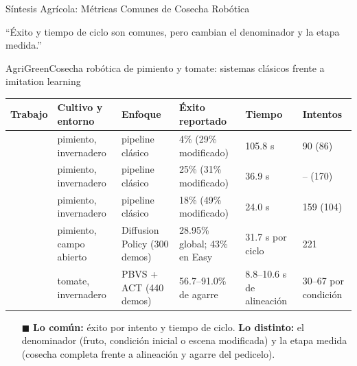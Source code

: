 \documentclass[aspectratio=169,10pt,xcolor={dvipsnames,table}]{beamer}
\newcommand{\BannerFont}{\fontsize{7.5}{9.2}\selectfont\bfseries}       %
\newcommand{\BannerArc}{1.5pt}             %
\newcommand{\BannerRule}{0.5pt}            %
\newcommand{\BannerLeftRule}{2.5pt}        %
\newcommand{\BannerCentral}[2][UCNCyan]{%
  \begin{tcolorbox}[
    enhanced,
    colback=#1!10,
    colframe=#1,
    boxrule=\BannerRule,
    leftrule=\BannerLeftRule,
    arc=\BannerArc,
    top=0.35mm, bottom=0.35mm, left=2mm, right=2mm
  ]
    {\BannerFont\raggedright\textcolor{UCNBlue}{#2}\par}
  \end{tcolorbox}%
  \vspace{-2.5mm}%
}
\newcommand{\BannerRef}[1]{{\mdseries\fontsize{5}{6}\selectfont\textcolor{TextDark!65}{\cite{#1}}}} %
\newcommand{\TabFont}{\fontsize{5.3}{6.4}\selectfont}                    %
\begin{document}
\begin{frame}{Síntesis Agrícola: Métricas Comunes de Cosecha Robótica}
  \BannerCentral[AgriGreen]{``Éxito y tiempo de ciclo son comunes, pero cambian el denominador y la etapa medida.'' \BannerRef{kim2025pepper,rong2026tomato}}
  \vspace{0.8mm}
  \begin{Card}{AgriGreen}{Cosecha robótica de pimiento y tomate: sistemas clásicos frente a imitation learning}
    {\TabFont
    \setlength{\tabcolsep}{1.4pt}
    \renewcommand{\arraystretch}{1.15}
    \begin{tabular}{@{}L{22mm} L{25mm} L{24mm} L{30mm} L{20mm} L{18mm}@{}}
      \toprule
      \textbf{Trabajo} & \textbf{Cultivo y entorno} & \textbf{Enfoque} & \textbf{Éxito reportado} & \textbf{Tiempo} & \textbf{Intentos} \\
      \midrule
      \cite{bac2017pepper} & pimiento, invernadero & pipeline clásico & 4\% (29\% modificado) & 105.8 s & 90 (86) \\
      \cite{lehnert2020pepper} & pimiento, invernadero & pipeline clásico & 25\% (31\% modificado) & 36.9 s & -- (170) \\
      \cite{arad2020pepper} & pimiento, invernadero & pipeline clásico & 18\% (49\% modificado) & 24.0 s & 159 (104) \\
       \cite{kim2025pepper} & pimiento, campo abierto & Diffusion Policy (300 demos) & 28.95\% global; 43\% en Easy & 31.7 s por ciclo & 221 \\
       \cite{rong2026tomato} & tomate, invernadero & PBVS + ACT (440 demos) & 56.7--91.0\% de agarre & 8.8--10.6 s de alineación & 30--67 por condición \\
      \bottomrule
    \end{tabular}\par
    \vspace{1.2mm}
    \begin{itemize}\setlength{\itemsep}{0.8pt}
      \item[\textcolor{AgriGreen}{$\blacksquare$}] \textbf{Lo común:} éxito por intento y tiempo de ciclo. \textbf{Lo distinto:} el denominador (fruto, condición inicial o escena modificada) y la etapa medida (cosecha completa frente a alineación y agarre del pedicelo).

\end{itemize}}
\end{Card}
\end{frame}
\end{document}
